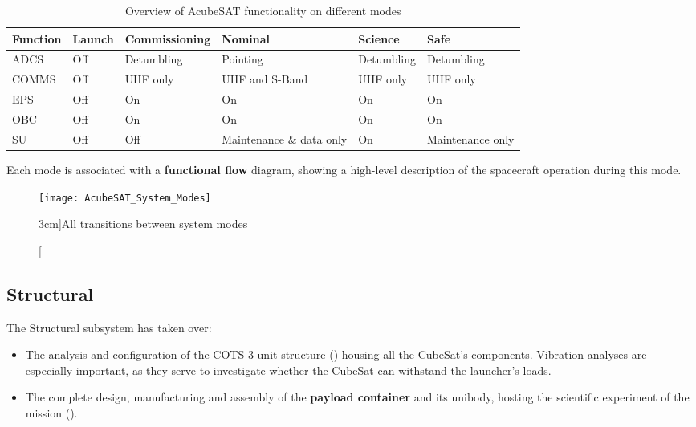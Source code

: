 \documentclass[a4paper,nobib]{tufte-book}
\begin{document}
\begin{table}[h]
	\centering
	\caption{Overview of AcubeSAT functionality on different modes}
	\label{tab:acubesatmodes}
	\begin{tabular}{@{}llllll@{}}
		\toprule
		Function    & Launch & Commissioning  & Nominal                 & Science        & Safe             \\ \midrule
		\acs{ADCS}  & \color{off} Off    & Detumbling     & \color{on} Pointing                & Detumbling     & Detumbling       \\
		\acs{COMMS} & \color{off} Off    & \acs{UHF} only & \color{on} \acs{UHF} and S-Band    & \acs{UHF} only & \acs{UHF} only   \\
		\acs{EPS}   & \color{off} Off    & \color{on} On             & \color{on} On                      & \color{on} On             & \color{on} On               \\
		\acs{OBC}   & \color{off} Off    & \color{on} On             & \color{on} On                      & \color{on} On             & \color{on} On               \\
		\acs{SU}    & \color{off} Off    & \color{off} Off            & Maintenance \& data only & \color{on} On             & Maintenance only \\ \bottomrule
	\end{tabular}
	\vspace{1em}
\end{table}


Each mode is associated with a \textbf{functional flow} diagram, showing a high-level description of the spacecraft operation during this mode.\autocite{acubesat_functional_2021}

\begin{figure}
	\centering
	\texttt{[image: AcubeSAT\_System\_Modes]}
	\caption[][3cm]{All transitions between system modes}
	\label{fig:transitions}
\end{figure}


\subsection{Structural}

The Structural subsystem has taken over:
\begin{itemize}
	\item The analysis and configuration of the \ac{COTS} 3-unit structure () housing all the CubeSat's components. Vibration analyses are especially important, as they serve to investigate whether the CubeSat can withstand the launcher's loads.
	\item The complete design, manufacturing and assembly of the \textbf{payload container} and its unibody, hosting the scientific experiment of the mission ().
\end{itemize}
\end{document}
